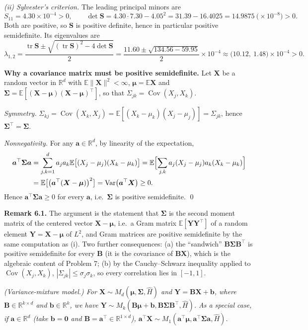 \documentclass{MFM-hw} %
\newcommand{\real}{\mathbb{R}}
\newcommand{\E}{\mathbb{E}}
\newcommand{\Cov}{\operatorname{Cov}}
\newcommand{\Var}{\operatorname{Var}}
\newcommand{\tr}{\operatorname{tr}}
\newcommand{\bX}{\bm{X}}
\newcommand{\bY}{\bm{Y}}
\newcommand{\bB}{\bm{B}}
\newcommand{\bS}{\bm{S}}
\newcommand{\ba}{\bm{a}}
\newcommand{\bb}{\bm{b}}
\newcommand{\bmu}{\bm{\mu}}
\newcommand{\bSigma}{\bm{\Sigma}}
\newcommand{\bzero}{\bm{0}}
\begin{document}
\emph{(ii) Sylvester's criterion.} The leading principal minors are
\[
    S_{11}=4.30\times10^{-4}>0,\qquad
    \det\bS=4.30\cdot7.30-4.05^2=31.39-16.4025=14.9875\ \bigl(\times10^{-8}\bigr)>0 .
\]
Both are positive, so $\bS$ is positive definite, hence in particular positive semidefinite. Its eigenvalues are
\[
    \lambda_{1,2}=\frac{\tr\bS\pm\sqrt{(\tr\bS)^2-4\det\bS}}{2}
    =\frac{11.60\pm\sqrt{134.56-59.95}}{2}\times10^{-4}
    \approx\bigl(10.12,\ 1.48\bigr)\times10^{-4}>0 .
\]
\checkmark

\HWsubproblem
\textbf{Why a covariance matrix must be positive semidefinite.} Let $\bX$ be a random vector in $\real^d$ with $\E\|\bX\|^2<\infty$, $\bmu=\E\bX$ and $\bSigma=\E[(\bX-\bmu)(\bX-\bmu)^\top]$, so that $\Sigma_{jk}=\Cov(X_j,X_k)$.

\emph{Symmetry.} $\Sigma_{kj}=\Cov(X_k,X_j)=\E[(X_k-\mu_k)(X_j-\mu_j)]=\Sigma_{jk}$, hence $\bSigma^\top=\bSigma$.

\emph{Nonnegativity.} For any $\ba\in\real^d$, by linearity of the expectation,
\begin{align*}
    \ba^\top\bSigma\ba
    &=\sum_{j,k=1}^d a_ja_k\E\bigl[(X_j-\mu_j)(X_k-\mu_k)\bigr]
    =\E\Bigl[\sum_{j,k}a_j(X_j-\mu_j)a_k(X_k-\mu_k)\Bigr] \\
    &=\E\bigl[\bigl(\ba^\top(\bX-\bmu)\bigr)^2\bigr]
    =\Var\bigl(\ba^\top\bX\bigr)\ge0 .
\end{align*}
Hence $\ba^\top\bSigma\ba\ge0$ for every $\ba$, i.e.\ $\bSigma$ is positive semidefinite. \qed

\smallskip
\noindent\textbf{Remark 6.1.} The argument is the statement that $\bSigma$ is the second moment matrix of the centered vector $\bX-\bmu$, i.e.\ a Gram matrix $\E[\bY\bY^\top]$ of a random element $\bY=\bX-\bmu$ of $L^2$, and Gram matrices are positive semidefinite by the same computation as (i). Two further consequences: (a) the ``sandwich'' $\bB\bSigma\bB^\top$ is positive semidefinite for every $\bB$ (it is the covariance of $\bB\bX$), which is the algebraic content of Problem 7; (b) by the Cauchy--Schwarz inequality applied to $\Cov(X_j,X_k)$, $|\Sigma_{jk}|\le\sigma_j\sigma_k$, so every correlation lies in $[-1,1]$.

\HWproblem
\noindent\textit{(Variance-mixture model.) For $\bX\sim M_d(\bmu,\bSigma,\hat H)$ and $\bY=\bB\bX+\bb$, where $\bB\in\real^{k\times d}$ and $\bb\in\real^k$, we have $\bY\sim M_k(\bB\bmu+\bb,\bB\bSigma\bB^\top,\hat H)$. As a special case, if $\ba\in\real^d$ (take $\bb=\bzero$ and $\bB=\ba^\top\in\real^{1\times d}$), $\ba^\top\bX\sim M_1(\ba^\top\bmu,\ba^\top\bSigma\ba,\hat H)$.}
\end{document}
